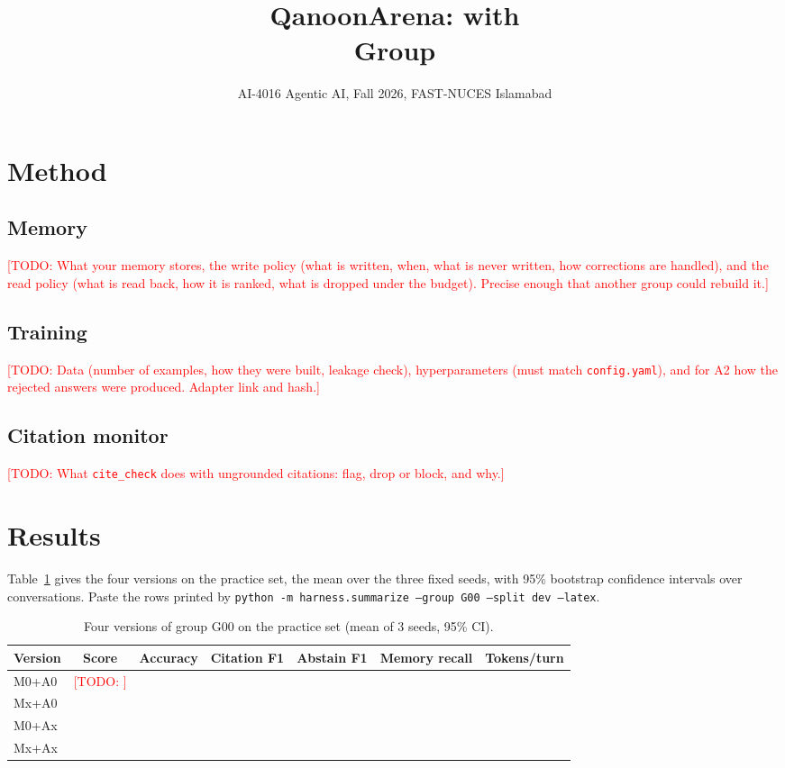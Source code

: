 \documentclass[11pt]{article}
\title{QanoonArena: \memtype{} with \traintype{}\\[2pt]\large Group \groupid{}}
\author{\members}
\date{AI-4016 Agentic AI, Fall 2026, FAST-NUCES Islamabad}
\newcommand{\groupid}{G00}
\newcommand{\todo}[1]{\textcolor{red}{[TODO: #1]}}
\begin{document}
\maketitle

\section{Method}
\label{sec:\groupid-method}

\subsection{Memory}
\todo{What your memory stores, the write policy (what is written, when, what is never written,
how corrections are handled), and the read policy (what is read back, how it is ranked, what is
dropped under the budget). Precise enough that another group could rebuild it.}

\subsection{Training}
\todo{Data (number of examples, how they were built, leakage check), hyperparameters (must match
\texttt{config.yaml}), and for A2 how the rejected answers were produced. Adapter link and hash.}

\subsection{Citation monitor}
\todo{What \texttt{cite\_check} does with ungrounded citations: flag, drop or block, and why.}

\section{Results}
\label{sec:\groupid-results}

Table~\ref{tab:\groupid-main} gives the four versions on the practice set, the mean over the three
fixed seeds, with 95\% bootstrap confidence intervals over conversations. Paste the rows printed
by \texttt{python -m harness.summarize --group \groupid{} --split dev --latex}.

\begin{table}[h]
\centering\small
\caption{Four versions of group \groupid{} on the practice set (mean of 3 seeds, 95\% CI).}
\label{tab:\groupid-main}
\begin{tabular}{lcccccr}
\toprule
Version & Score & Accuracy & Citation F1 & Abstain F1 & Memory recall & Tokens/turn \\
\midrule
M0+A0 & \todo{} & & & & & \\
Mx+A0 & & & & & & \\
M0+Ax & & & & & & \\
Mx+Ax & & & & & & \\
\bottomrule
\end{tabular}
\end{table}
\end{document}
